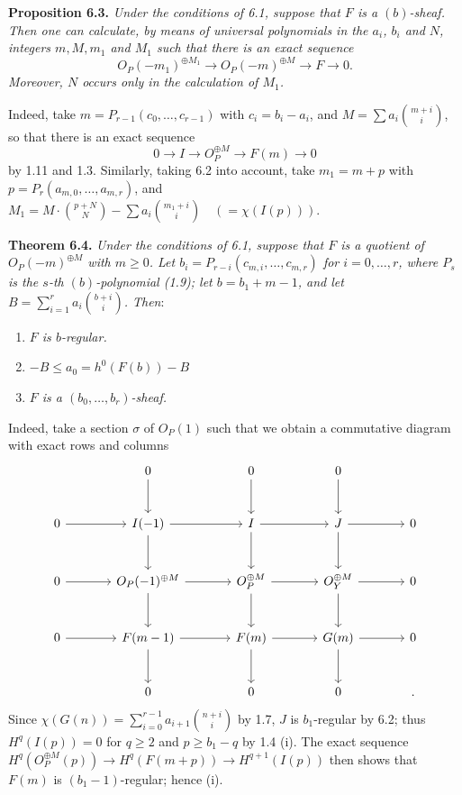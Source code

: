 \textbf{Proposition 6.3.} \emph{Under the conditions of 6.1, suppose that $F$ is a $(b)$-sheaf. Then one can calculate, by means of universal polynomials in the $a_i$, $b_i$ and $N$, integers $m, M, m_1$ and $M_1$ such that there is an exact sequence}
\[
   {O}_P(-m_1)^{\oplus M_1}\longrightarrow
   {O}_P(-m)^{\oplus M}\longrightarrow F\longrightarrow0.
\]
\emph{Moreover, $N$ occurs only in the calculation of $M_1$.}

%
Indeed, take $m=P_{r-1}(c_0,\ldots,c_{r-1})$ with $c_i=b_i-a_i$, and $M=\sum a_i\binom{m+i}{i}$, so that there is an exact sequence
\[
   0\longrightarrow I\longrightarrow {O}_P^{\oplus M}
   \longrightarrow F(m)\longrightarrow0
\]
by 1.11 and 1.3. Similarly, taking 6.2 into account, take $m_1=m+p$ with $p=P_r(a_{m,0},\ldots,a_{m,r})$, and $M_1=M\cdot\binom{p+N}{N}-\sum a_i\binom{m_1+i}{i}\quad(=\chi(I(p)))$.

\textbf{Theorem 6.4.} \emph{Under the conditions of 6.1, suppose that $F$ is a quotient of ${O}_P(-m)^{\oplus M}$ with $m\ge0$. Let $b_i=P_{r-i}(c_{m,i},\ldots,c_{m,r})$ for $i=0,\ldots,r$, where $P_s$ is the $s$-th $(b)$-polynomial (1.9); let $b=b_1+m-1$, and let $B=\sum_{i=1}^{r} a_i\binom{b+i}{i}$. Then}:
\begin{enumerate}[label=(\roman*)]
\item \emph{$F$ is $b$-regular.}
\item \emph{$-B\le a_0=h^0(F(b))-B$}
\item \emph{$F$ is a $(b_0,\ldots,b_r)$-sheaf.}
\end{enumerate}

Indeed, take a section $\sigma$ of ${O}_P(1)$ such that we obtain a commutative diagram with exact rows and columns
\[
\begin{tikzcd}[column sep=large,row sep=large]
&0 \arrow[d]&0 \arrow[d]&0 \arrow[d]&\\
0 \arrow[r]&I(-1) \arrow[r] \arrow[d]&I \arrow[r] \arrow[d]&J \arrow[r] \arrow[d]&0\\
0 \arrow[r]&{O}_P(-1)^{\oplus M} \arrow[r] \arrow[d]&{O}_P^{\oplus M} \arrow[r] \arrow[d]&{O}_Y^{\oplus M} \arrow[r] \arrow[d]&0\\
0 \arrow[r]&F(m-1) \arrow[r] \arrow[d]&F(m) \arrow[r] \arrow[d]&G(m) \arrow[r] \arrow[d]&0\\
&0&0&0&.
\end{tikzcd}
\]
%
Since \(\chi(G(n))=\sum_{i=0}^{r-1} a_{i+1}\binom{n+i}{i}\) by 1.7, $J$ is $b_1$-regular by 6.2; thus \(H^q(I(p))=0\) for $q\ge2$ and $p\ge b_1-q$ by 1.4 (i). The exact sequence \(H^q({O}_P^{\oplus M}(p))\longrightarrow H^q(F(m+p))\longrightarrow H^{q+1}(I(p))\) then shows that $F(m)$ is $(b_1-1)$-regular; hence (i).

